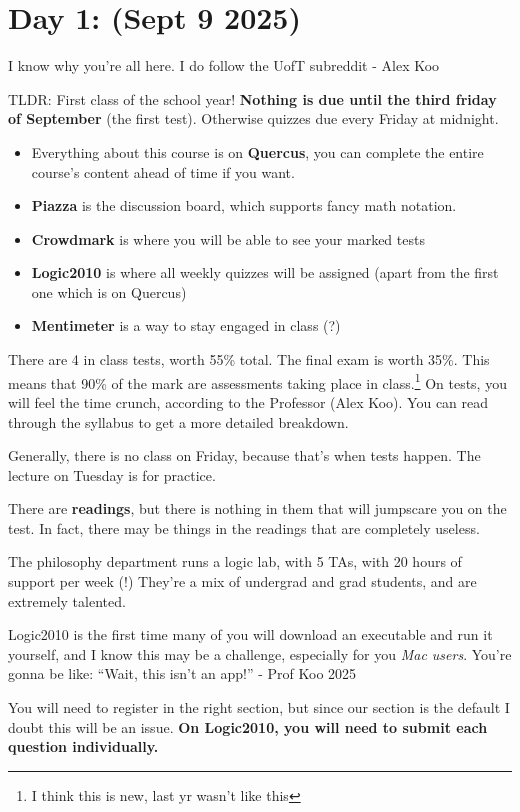 \section{Day 1: (Sept 9 2025)}

\begin{remark}
I know why you're all here. I do follow the UofT subreddit - Alex Koo
\end{remark}

\noindent TLDR: First class of the school year! \textbf{Nothing is due until the third friday of September} (the first test). Otherwise quizzes due every Friday at midnight.

\begin{itemize}
\item Everything about this course is on \textbf{Quercus}, you can complete the entire course's content ahead of time if you want. 
\item \textbf{Piazza} is the discussion board, which supports fancy math notation.
\item \textbf{Crowdmark} is where you will be able to see your marked tests
    \item \textbf{Logic2010} is where all weekly quizzes will be assigned (apart from the first one which is on Quercus)
    \item \textbf{Mentimeter} is a way to stay engaged in class (?)
\end{itemize}

There are 4 in class tests, worth 55\% total. The final exam is worth 35\%. This means that 90\% of the mark are assessments taking place in class.\footnote{I think this is new, last yr wasn't like this} On tests, you will feel the time crunch, according to the Professor (Alex Koo). You can read through the syllabus to get a more detailed breakdown.

Generally, there is no class on Friday, because that's when tests happen. The lecture on Tuesday is for practice.

There are \textbf{readings}, but there is nothing in them that will jumpscare you on the test. In fact, there may be things in the readings that are completely useless.

The philosophy department runs a logic lab, with 5 TAs, with 20 hours of support per week (!) They're a mix of undergrad and grad students, and are extremely talented.

\begin{remark}
Logic2010 is the first time many of you will download an executable and run it yourself, and I know this may be a challenge, especially for you \textit{Mac users}. You're gonna be like: ``Wait, this isn't an app!'' - Prof Koo 2025
\end{remark}

You will need to register in the right section, but since our section is the default I doubt this will be an issue. \textbf{On Logic2010, you will need to submit each question individually.}
